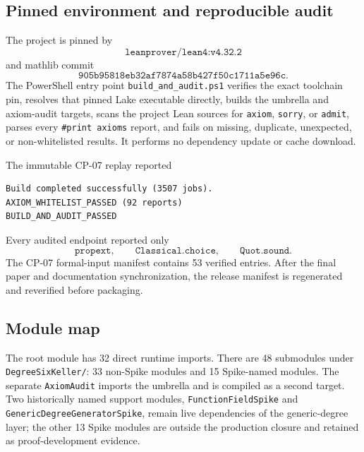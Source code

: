 \documentclass[11pt]{article}
\begin{document}
\subsection{Pinned environment and reproducible audit}

The project is pinned by
\[
 \texttt{leanprover/lean4:v4.32.2}
\]
and mathlib commit
\[
 \texttt{905b95818eb32af7874a58b427f50c1711a5e96c}.
\]
The PowerShell entry point \texttt{build\_and\_audit.ps1} verifies the exact
toolchain pin, resolves that pinned Lake executable directly, builds the
umbrella and axiom-audit targets, scans the project Lean sources for
\texttt{axiom}, \texttt{sorry}, or \texttt{admit}, parses every
\texttt{\#print axioms} report, and fails on missing, duplicate, unexpected,
or non-whitelisted results.  It performs no dependency update or cache
download.

The immutable CP-07 replay reported
\begin{lstlisting}[language={}]
Build completed successfully (3507 jobs).
AXIOM_WHITELIST_PASSED (92 reports)
BUILD_AND_AUDIT_PASSED
\end{lstlisting}
Every audited endpoint reported only
\[
 \texttt{propext},\qquad
 \texttt{Classical.choice},\qquad
 \texttt{Quot.sound}.
\]
The CP-07 formal-input manifest contains 53 verified entries.  After the final
paper and documentation synchronization, the release manifest is regenerated
and reverified before packaging.

\subsection{Module map}

The root module has 32 direct runtime imports.  There are 48 submodules under
\texttt{DegreeSixKeller/}: 33 non-Spike modules and 15 Spike-named modules.
The separate \texttt{AxiomAudit} imports the umbrella and is compiled as a
second target.  Two historically named support modules,
\texttt{FunctionFieldSpike} and \texttt{GenericDegreeGeneratorSpike}, remain
live dependencies of the generic-degree layer; the other 13 Spike modules are
outside the production closure and retained as proof-development evidence.
\end{document}
